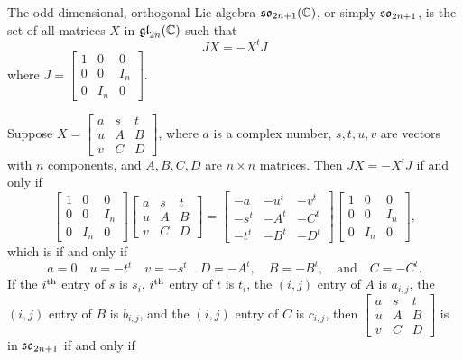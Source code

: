 The odd-dimensional, orthogonal Lie algebra $\mathfrak {so}_{2n+1}({\mathbb C})$, or simply
$\mathfrak {so}_{2n+1}$, is the set of all matrices $X$ in $\mathfrak {gl}_{2n}({\mathbb C})$ such that
\[
JX= -X^t J
\]
where $J= \left[\begin{smallmatrix} 1&0&0\\ 0 &0&I_n\\ 0&I_n
    &0\end{smallmatrix} \right]$.  

Suppose $X=\left[\begin{smallmatrix} a&s&t\\ u&A&B\\ v&C&
    D \end{smallmatrix} \right]$, where $a$ is a complex number, $s,t,u,v$
are vectors with $n$ components, and $A, B, C, D$ are $n\times n$
matrices. Then $JX= -X^t J$ if and only if
\[
\begin{bmatrix}
  1&0&0\\ 0&0&I_n\\ 0&I_n& 0
\end{bmatrix}
\begin{bmatrix}
  a&s&t\\ u&A&B\\ v&C& D
\end{bmatrix}
=
\begin{bmatrix}
  -a&-u^t&-v^t\\-s^t&-A^t&-C^t\\ -t^t&-B^t&-D^t
\end{bmatrix}
\begin{bmatrix}
  1&0&0\\ 0&0&I_n\\ 0&I_n& 0
\end{bmatrix},
\]
which is if and only if
\[
a=0\quad u=-t^t \quad v=-s^t\quad D=-A^t,\quad B=-B^t,\quad\text{and} \quad
C=-C^t.
\]
If the $i{^{\text{th}}}$ entry of $s$ is $s_i$, $i{^{\text{th}}}$ entry of $t$ is $t_i$, the
$(i,j)$ entry of $A$ is $a_{i,j}$, the $(i,j)$ entry of $B$ is $b_{i,j}$,
and the $(i,j)$ entry of $C$ is $c_{i,j}$, then $\left[\begin{smallmatrix}
    a&s&t\\ u&A&B\\ v&C& D \end{smallmatrix} \right]$ is in $\mathfrak {so}_{2n+1}$ if
and only if
